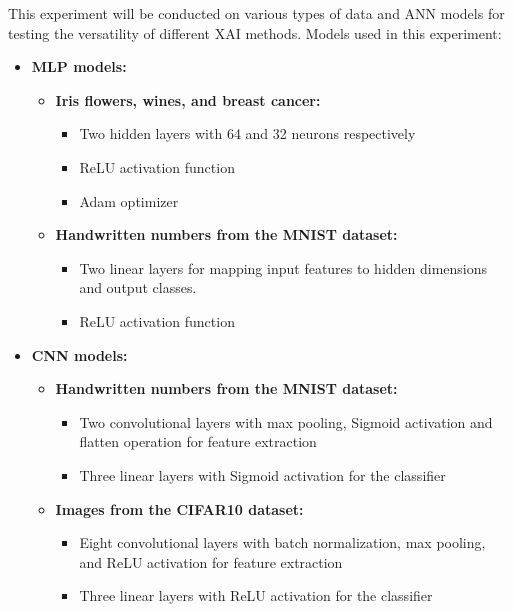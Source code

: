 \documentclass[journal, a4paper]{IEEEtran}
\begin{document}
This experiment will be conducted on various types of data and ANN models for testing the versatility of different XAI methods.
Models used in this experiment:
\begin{itemize}
    \item \textbf{MLP models:}
          \begin{itemize}
              \item \textbf{Iris flowers, wines, and breast cancer:}
                    \begin{itemize}
                        \item Two hidden layers with 64 and 32 neurons respectively
                        \item ReLU activation function
                        \item Adam optimizer
                    \end{itemize}

              \item \textbf{Handwritten numbers from the MNIST dataset:}
                    \begin{itemize}
                        \item Two linear layers for mapping input features to hidden dimensions and output classes.
                        \item ReLU activation function
                    \end{itemize}
          \end{itemize}
    \item \textbf{CNN models:}
          \begin{itemize}
              \item \textbf{Handwritten numbers from the MNIST dataset:}
                    \begin{itemize}
                        \item Two convolutional layers with max pooling, Sigmoid activation and flatten operation for feature extraction
                        \item Three linear layers with Sigmoid activation for the classifier
                    \end{itemize}

              \item \textbf{Images from the CIFAR10 dataset:}
                    \begin{itemize}
                        \item Eight convolutional layers with batch normalization, max pooling, and ReLU activation for feature extraction
                        \item Three linear layers with ReLU activation for the classifier
                    \end{itemize}
          \end{itemize}

\end{itemize}
\end{document}
